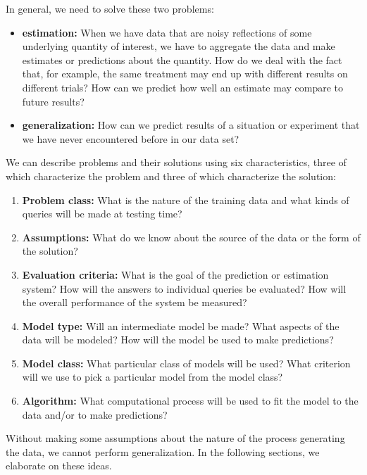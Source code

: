 In general, we need to solve these two problems:
\begin{itemize}
  \item {\bf estimation:}  When we have data that are noisy reflections
        of some underlying quantity of interest, we have to aggregate the
        data and make estimates or predictions about the quantity.
        How do we deal with the fact that, for
        example, the same treatment may end up with different results on
        different trials?  How can we predict how well an estimate may
        compare to future results?
  \item {\bf generalization:} How can we predict results of a situation
        or experiment that we have never encountered before in our data set?
\end{itemize}

We can describe problems and their solutions using six
characteristics, three of which characterize the problem and three of
which characterize the solution:
\begin{enumerate}
  \item {\bf Problem class:}  What is the nature of the training data and what
        kinds of queries will be made at testing time?
  \item {\bf Assumptions:}  What do we know about the source of the data or the form of the solution?
  \item {\bf Evaluation criteria:}  What is the goal of the prediction or estimation system?  How  will the answers to individual queries be evaluated?  How will the overall performance of the system be measured?
  \item {\bf Model type:}  Will an intermediate model be made?  What aspects of the data will be modeled?  How will the model be used to make predictions? 
  \item {\bf Model class:} What particular class of models
        will be used?  What criterion will we use to pick a particular model
        from the model class?
  \item {\bf Algorithm:}  What computational process will be used to fit
        the model to the data and/or to make predictions?
\end{enumerate}
Without making some assumptions about the nature of the process
generating the data, we cannot perform generalization.  In the
following sections, we elaborate on these ideas.



